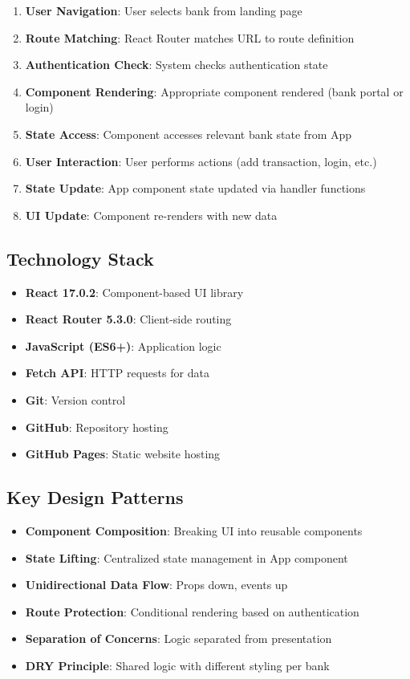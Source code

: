 \documentclass[11pt,a4paper]{article}
\begin{document}
\begin{enumerate}[leftmargin=*]
    \item \textbf{User Navigation}: User selects bank from landing page
    \item \textbf{Route Matching}: React Router matches URL to route definition
    \item \textbf{Authentication Check}: System checks authentication state
    \item \textbf{Component Rendering}: Appropriate component rendered (bank portal or login)
    \item \textbf{State Access}: Component accesses relevant bank state from App
    \item \textbf{User Interaction}: User performs actions (add transaction, login, etc.)
    \item \textbf{State Update}: App component state updated via handler functions
    \item \textbf{UI Update}: Component re-renders with new data
\end{enumerate}

\subsection{Technology Stack}

\begin{itemize}[leftmargin=*]
    \item \textbf{React 17.0.2}: Component-based UI library
    \item \textbf{React Router 5.3.0}: Client-side routing
    \item \textbf{JavaScript (ES6+)}: Application logic
    \item \textbf{Fetch API}: HTTP requests for data
    \item \textbf{Git}: Version control
    \item \textbf{GitHub}: Repository hosting
    \item \textbf{GitHub Pages}: Static website hosting
\end{itemize}

\subsection{Key Design Patterns}

\begin{itemize}[leftmargin=*]
    \item \textbf{Component Composition}: Breaking UI into reusable components
    \item \textbf{State Lifting}: Centralized state management in App component
    \item \textbf{Unidirectional Data Flow}: Props down, events up
    \item \textbf{Route Protection}: Conditional rendering based on authentication
    \item \textbf{Separation of Concerns}: Logic separated from presentation
    \item \textbf{DRY Principle}: Shared logic with different styling per bank
\end{itemize}
\end{document}
